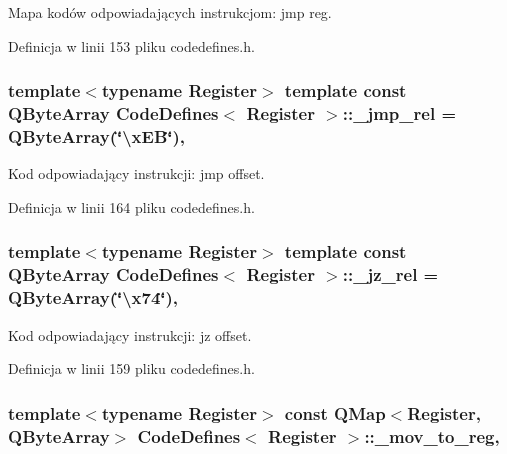 Mapa kodów odpowiadających instrukcjom\-: jmp reg. 



Definicja w linii 153 pliku codedefines.\-h.

\hypertarget{class_code_defines_a3148e9473e27ad97b441d911e643dd63}{
\subsubsection[{\-\_\-jmp\-\_\-rel}]{\setlength{\rightskip}{0pt plus 5cm}template$<$typename Register$>$ template const Q\-Byte\-Array {\bf Code\-Defines}$<$ Register $>$\-::\-\_\-jmp\-\_\-rel = Q\-Byte\-Array(\char`\"{}\textbackslash{}x\-E\-B\char`\"{})\hspace{0.3cm}{\ttfamily [static]}, {\ttfamily [private]}}}\label{class_code_defines_a3148e9473e27ad97b441d911e643dd63}


Kod odpowiadający instrukcji\-: jmp offset. 



Definicja w linii 164 pliku codedefines.\-h.

\hypertarget{class_code_defines_adf4c7713c104164cb72d122d4478498e}{
\subsubsection[{\-\_\-jz\-\_\-rel}]{\setlength{\rightskip}{0pt plus 5cm}template$<$typename Register$>$ template const Q\-Byte\-Array {\bf Code\-Defines}$<$ Register $>$\-::\-\_\-jz\-\_\-rel = Q\-Byte\-Array(\char`\"{}\textbackslash{}x74\char`\"{})\hspace{0.3cm}{\ttfamily [static]}, {\ttfamily [private]}}}\label{class_code_defines_adf4c7713c104164cb72d122d4478498e}


Kod odpowiadający instrukcji\-: jz offset. 



Definicja w linii 159 pliku codedefines.\-h.

\hypertarget{class_code_defines_ae1ef8890be45feca92a5b70f11731192}{
\subsubsection[{\-\_\-mov\-\_\-to\-\_\-reg}]{\setlength{\rightskip}{0pt plus 5cm}template$<$typename Register$>$ const Q\-Map$<$Register, Q\-Byte\-Array$>$ {\bf Code\-Defines}$<$ Register $>$\-::\-\_\-mov\-\_\-to\-\_\-reg\hspace{0.3cm}{\ttfamily [static]}, {\ttfamily [private]}}}\label{class_code_defines_ae1ef8890be45feca92a5b70f11731192}


